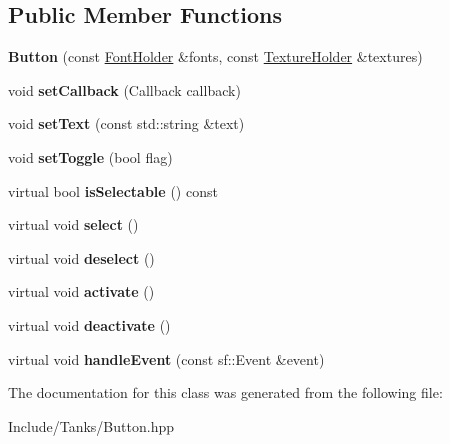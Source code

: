 \subsection*{Public Member Functions}
\begin{DoxyCompactItemize}
\item 
\hypertarget{class_g_u_i_1_1_button_aa624162ff8bee4bd4523428c3ea2150b}{}{\bfseries Button} (const \hyperlink{class_resource_holder}{Font\+Holder} \&fonts, const \hyperlink{class_resource_holder}{Texture\+Holder} \&textures)\label{class_g_u_i_1_1_button_aa624162ff8bee4bd4523428c3ea2150b}

\item 
\hypertarget{class_g_u_i_1_1_button_ae5ac54c7429eaa482eb7069d0efdb79f}{}void {\bfseries set\+Callback} (Callback callback)\label{class_g_u_i_1_1_button_ae5ac54c7429eaa482eb7069d0efdb79f}

\item 
\hypertarget{class_g_u_i_1_1_button_a89e964d353192135d6a77aeff33bbc41}{}void {\bfseries set\+Text} (const std\+::string \&text)\label{class_g_u_i_1_1_button_a89e964d353192135d6a77aeff33bbc41}

\item 
\hypertarget{class_g_u_i_1_1_button_a8198052cf4fe5823c9f5513e778ca94d}{}void {\bfseries set\+Toggle} (bool flag)\label{class_g_u_i_1_1_button_a8198052cf4fe5823c9f5513e778ca94d}

\item 
\hypertarget{class_g_u_i_1_1_button_ab494980476e92b67878c8b86958e4768}{}virtual bool {\bfseries is\+Selectable} () const \label{class_g_u_i_1_1_button_ab494980476e92b67878c8b86958e4768}

\item 
\hypertarget{class_g_u_i_1_1_button_af18d9012525f9431bb86127d248e4851}{}virtual void {\bfseries select} ()\label{class_g_u_i_1_1_button_af18d9012525f9431bb86127d248e4851}

\item 
\hypertarget{class_g_u_i_1_1_button_a93596a77391e32c54da2b6699e08aaf3}{}virtual void {\bfseries deselect} ()\label{class_g_u_i_1_1_button_a93596a77391e32c54da2b6699e08aaf3}

\item 
\hypertarget{class_g_u_i_1_1_button_adb322ef2c0bf27c9a28e22464732859b}{}virtual void {\bfseries activate} ()\label{class_g_u_i_1_1_button_adb322ef2c0bf27c9a28e22464732859b}

\item 
\hypertarget{class_g_u_i_1_1_button_a02c8762837eb47fe1965f75d4580a59b}{}virtual void {\bfseries deactivate} ()\label{class_g_u_i_1_1_button_a02c8762837eb47fe1965f75d4580a59b}

\item 
\hypertarget{class_g_u_i_1_1_button_ab015659c2c765a0dbf3a7201a60726cd}{}virtual void {\bfseries handle\+Event} (const sf\+::\+Event \&event)\label{class_g_u_i_1_1_button_ab015659c2c765a0dbf3a7201a60726cd}

\end{DoxyCompactItemize}


The documentation for this class was generated from the following file\+:\begin{DoxyCompactItemize}
\item 
Include/\+Tanks/Button.\+hpp\end{DoxyCompactItemize}
